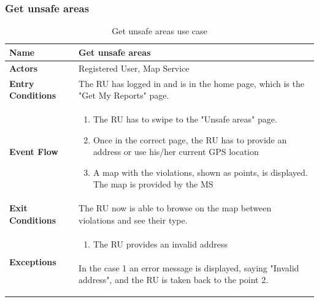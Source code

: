 					\subsubsection{Get unsafe areas}
					\begin{table}[!h]
						\centering
						\vspace{-4mm}
						\begin{tabular}{lp{}}
							\toprule
							\textbf{Name} & \textbf{Get unsafe areas} \\[1mm]
							\midrule
							\textbf{Actors} & Registered User, Map Service \\[1mm]
							\textbf{Entry Conditions} &The RU has logged in and is in the home page, which is the "Get My Reports" page. \vspace{1mm}\\
							\textbf{Event Flow} &
							\vspace{-5mm} 
							\begin{enumerate}
								\setlength\itemsep{0.2mm}
								\item The RU has to swipe to the "Unsafe areas" page.
								\item Once in the correct page, the RU has to provide an address or use his/her current GPS location
								\item A map with the violations, shown as points, is displayed. The map is provided by the MS
							\end{enumerate} \\
							\textbf{Exit Conditions} & The RU now is able to browse on the map between violations and see their type. \vspace{1mm}\\
							\textbf{Exceptions} & 
								\vspace{-5mm} 
								\begin{enumerate}
									\item The RU provides an invalid address
								\end{enumerate}
								\vspace{-7mm}
								\paragraph{}
									In the case 1 an error message is displayed, saying "Invalid address", and the RU is taken back to the point 2. \\
							\bottomrule
						\end{tabular}
						\caption{Get unsafe areas use case}
					\end{table}
					\clearpage
